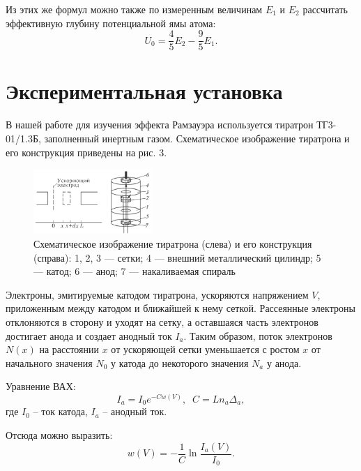 	Из этих же формул можно также по измеренным величинам $E_1$ и $E_2$ рассчитать эффективную глубину потенциальной ямы атома:
	\begin{equation}
		U_0 = \frac{4}{5}E_2 - \frac{9}{5}E_1.
		\label{U_0}
	\end{equation}


	\newpage
	\section*{Экспериментальная установка}
	
	В нашей работе для изучения эффекта Рамзауэра используется тиратрон ТГ3-01/1.3Б, заполненный инертным газом. Схематическое изображение тиратрона и его конструкция приведены на рис. 3.
	
	\begin{figure}
		\includegraphics[width=0.4\textwidth]{./Pictures/3.png}
		\caption{Схематическое изображение тиратрона (слева) и его конструкция (справа): 1, 2, 3 — сетки; 4 — внешний металлический цилиндр; 5 — катод; 6 — анод; 7 — накаливаемая спираль}
	\end{figure}

	Электроны, эмитируемые катодом тиратрона, ускоряются напряжением $V$, приложенным между катодом и ближайшей к нему сеткой. Рассеянные электроны отклоняются в сторону и уходят на сетку, а оставшаяся часть электронов достигает анода и создает анодный ток $I_a$. Таким образом, поток электронов $N(x)$ на расстоянии $x$ от ускоряющей сетки уменьшается с ростом $x$ от начального значения $N_0$ у катода до некоторого
	значения $N_a$ у анода.
	
	Уравнение ВАХ:
	\begin{equation}
		I_a = I_0 e^{-C w(V)}, \;\; C = L n_a \Delta_a,
	\end{equation}
	где $I_0$ -- ток катода, $I_a$ -- анодный ток.
	
	Отсюда можно выразить:
	\begin{equation}
		w(V) = -\frac{1}{C} \ln\frac{I_a(V)}{I_0}.
		\label{w}
	\end{equation}
	
